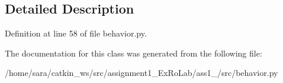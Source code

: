 \subsection{Detailed Description}


Definition at line 58 of file behavior.\+py.



The documentation for this class was generated from the following file\+:\begin{DoxyCompactItemize}
\item 
/home/sara/catkin\+\_\+ws/src/assignment1\+\_\+\+Ex\+Ro\+Lab/ass1\+\_/src/behavior.\+py\end{DoxyCompactItemize}
